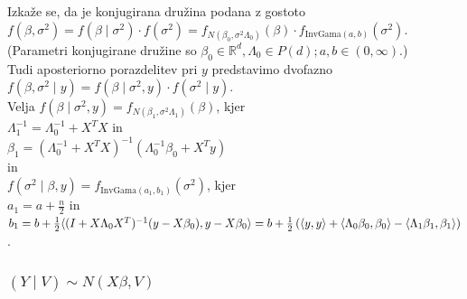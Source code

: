 \documentclass[a4paper, 12pt]{book}
\theoremstyle{definition}
\theoremstyle{remark}
\newcommand{\R}{\mathbb{R}}
\begin{document}
Izkaže se, da je konjugirana družina podana z gostoto \\
$f(\beta, \sigma^2) = f(\beta \mid \sigma^2) \cdot f(\sigma^2)
= f_{N(\beta_0, \sigma^2 \Lambda_0)}(\beta) \cdot f_{\text{InvGama}(a, b)}(\sigma^2)$. \\
(Parametri konjugirane družine so $\beta_0 \in \R^d, \Lambda_0 \in P(d); a, b \in (0, \infty)$.) \\
Tudi aposteriorno porazdelitev pri $y$ predstavimo dvofazno \\
$f(\beta, \sigma^2 \mid y) = f(\beta \mid \sigma^2, y) \cdot f(\sigma^2 \mid y)$. \\
Velja $f(\beta \mid \sigma^2, y) = f_{N(\beta_1, \sigma^2 \Lambda_1)}(\beta)$, kjer \\
$\Lambda_1^{-1} = \Lambda_0^{-1} + X^T X$ in \\
$\beta_1 = (\Lambda_0^{-1} + X^T X)^{-1} (\Lambda_0^{-1} \beta_0 + X^T y)$ \\
in \\
$f(\sigma^2 \mid \beta, y) = f_{\text{InvGama}(a_1, b_1)}(\sigma^2)$, kjer \\
$a_1 = a + \frac{n}{2}$ in \\
$b_1 = b + \frac{1}{2} \langle (I + X \Lambda_0 X^T)^{-1} (y - X \beta_0), y - X \beta_0 \rangle \\
= b + \frac{1}{2} \left( \langle y, y \rangle + \langle \Lambda_0 \beta_0, \beta_0 \rangle
 - \langle \Lambda_1 \beta_1, \beta_1 \rangle \right)$.



\subsubsection{$(Y \mid V) \sim N(X \beta, V)$}
\end{document}
